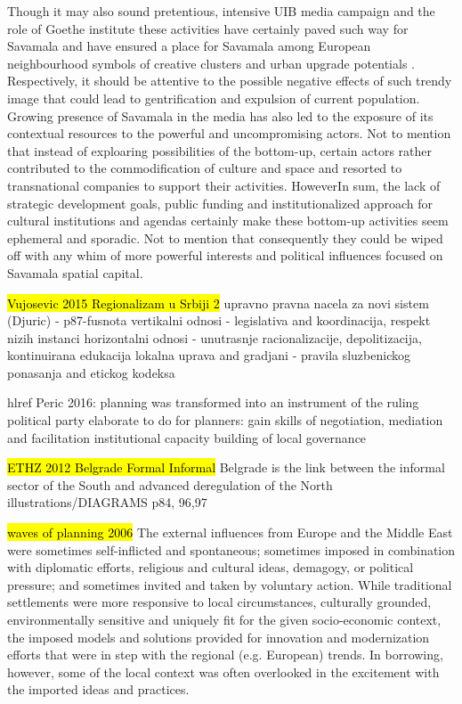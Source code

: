 \documentclass[11pt]{report}
\begin{document}
Though it may also sound pretentious, intensive UIB media campaign  and the role of Goethe institute these activities have certainly paved such way for Savamala and have ensured a place for Savamala among European neighbourhood symbols of creative clusters and urban upgrade potentials  .  Respectively, it should be attentive to the possible negative effects of such trendy image that could lead to gentrification and expulsion of current population. Growing presence of Savamala in the media has also led to the exposure of its contextual resources to the powerful and uncompromising actors. Not to mention that instead of exploaring possibilities of the bottom-up, certain actors rather contributed to the commodification of culture and space and resorted to transnational companies   to support their activities.  HoweverIn sum, the lack of strategic development goals, public funding and institutionalized approach for cultural institutions and agendas certainly make these bottom-up activities seem ephemeral and sporadic. Not to mention that consequently they could be wiped off with any whim of more powerful interests and political influences focused on Savamala spatial capital.

\hl{Vujosevic 2015 Regionalizam u Srbiji 2}
upravno pravna nacela za novi sistem (Djuric) - p87-fusnota
    vertikalni odnosi - legislativa and koordinacija, respekt nizih instanci
    horizontalni odnosi - unutrasnje racionalizacije, depolitizacija, kontinuirana edukacija
    lokalna uprava and gradjani - pravila sluzbenickog ponasanja and etickog kodeksa
    
hl{ref Peric 2016}: planning was transformed into an instrument of the ruling political party elaborate
to do for planners:
     gain skills of negotiation, mediation and facilitation
    institutional capacity building of local governance
    
\hl{ETHZ 2012 Belgrade Formal Informal}
Belgrade is the link between the informal sector of the South and advanced deregulation of the North
illustrations/DIAGRAMS p84, 96,97

 	\hl{waves of planning 2006}
The  external  influences  from Europe  and  the  Middle  East  were  sometimes  self-inflicted  and  spontaneous;  sometimes imposed in combination with diplomatic efforts, religious and cultural ideas, demagogy, or political pressure; and sometimes invited and taken by voluntary action. While traditional settlements were more responsive to local circumstances, culturally grounded, environmentally sensitive and uniquely fit for the given socio-economic context, the imposed models and solutions provided for innovation and modernization efforts that were in step with the regional (e.g. European) trends. In borrowing, however, some of the local context was often overlooked in the excitement with the imported ideas and practices.
\end{document}

